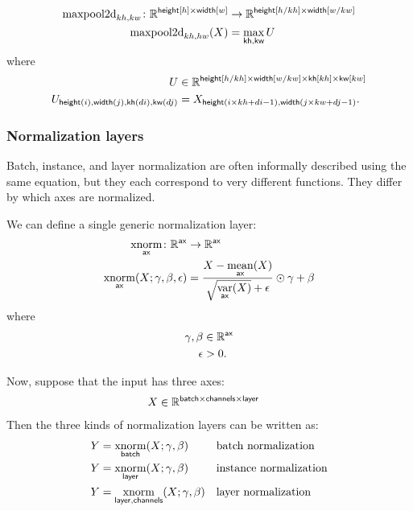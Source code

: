 \documentclass{article}
\newcommand{\reals}{\mathbb{R}}
\begin{document}
\begin{align*}
\text{maxpool2d}_{kh,kw} \colon \mathbb{R}^{\nset{height}{h} \times \nset{width}{w}} &\rightarrow \mathbb{R}^{\nset{height}{h/kh} \times \nset{width}{w/kw}} \\
\text{maxpool2d}_{kh,hw}(X) &= \nfun{kh, kw}{max} U
\end{align*}
where
\begin{align*}
U &\in \reals^{\nset{height}{h / kh} \times \nset{width}{w / kw} \times \nset{kh}{kh} \times \nset{kw}{kw}} \\
U_{\nidx{height}{i}, \nidx{width}{j}, \nidx{kh}{di}, \nidx{kw}{dj}} & = X_{\nidx{height}{i \times kh + di -1}, \nidx{width}{j \times kw + dj -1}}.
\end{align*}

\subsubsection{Normalization layers}

Batch, instance, and layer normalization are often informally described using the same
equation, but they each correspond to very different functions. They differ
by which axes are normalized.

We can define a single generic normalization layer:
\begin{align*}
  \nfun{ax}{xnorm} \colon \mathbb{R}^{\name{ax}} &\rightarrow \mathbb{R}^{\name{ax}} \\
  \nfun{ax}{xnorm}(X; \gamma, \beta, \epsilon) &= \frac{X - \nfun{ax}{mean}(X)}{\sqrt{\nfun{ax}{var}(X)} + \epsilon} \odot \gamma + \beta
\end{align*}
where
\begin{align*}
  \gamma, \beta &\in \mathbb{R}^{\name{ax}} \\
  \epsilon &> 0.
\end{align*}

Now, suppose that the input has three axes:
\begin{align*}
X &\in \reals^{{\name{batch} \times \name{channels} \times \name{layer}}}
\end{align*}
Then the three kinds of normalization layers can be written as:
\begin{align*}
Y &= \nfun{batch}{xnorm}(X; \gamma, \beta) && \text{batch normalization} \\
Y &= \nfun{layer}{xnorm}(X; \gamma, \beta) && \text{instance normalization} \\
Y &= \nfun{layer,channels}{xnorm}(X; \gamma, \beta) && \text{layer normalization}
\end{align*}
\end{document}
